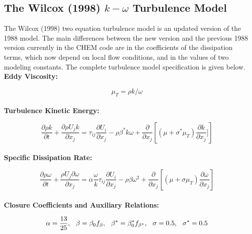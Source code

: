 \subsection{The Wilcox (1998) $k-\omega$ Turbulence Model}
\label{wilcox_kw}

The Wilcox (1998) two equation turbulence model\cite{WilcoxBook} is an
updated version of the 1988 model\cite{Wilcox.88}.  The main
differences between the new version and the previous 1988 version
currently in the CHEM code are in the coefficients of the dissipation
terms, which now depend on local flow conditions, and in the values of
two modeling constants.  The complete turbulence model specification
is given below.\\ 

\noindent
\textbf{Eddy Viscosity:}

\begin{equation}
\mu_T = \rho k/\omega
\label{eddy_viscosity}
\end{equation}\\

\noindent
\textbf{Turbulence Kinetic Energy:}

\begin{equation}
\frac{\partial{\rho k}} {\partial{t}} + \frac{\partial{\rho U_j k}}{\partial{x_j}} =
\tau_{ij} \frac{\partial{U_i}}{\partial{x_j}} - \rho \beta^* k \omega +
\frac{\partial}{\partial{x_j}} \left[ (\mu + \sigma^* \mu_T) \frac{\partial{k}}{\partial{x_j}}] \right]
\label{tke_equation}
\end{equation}\\

\noindent
\textbf{Specific Dissipation Rate:}

\begin{equation}
\frac{\partial{\rho \omega}} {\partial{t}} + \frac{\rho U_j \partial{\omega}}{\partial{x_j}} =
\alpha \frac{\omega}{k} \tau_{ij} \frac{\partial{U_i}}{\partial{x_j}} -
\rho \beta \omega^2 +
\frac{\partial}{\partial{x_j}} \left[ (\mu + \sigma \mu_T) \frac{\partial{\omega}}{\partial{x_j}} \right]
\label{omega_equation}
\end{equation}\\

\noindent
\textbf{Closure Coefficients and Auxiliary Relations:}

\begin{equation}
\alpha = \frac{13}{25}, \hspace{0.1in}
\beta = \beta_0 f_{\beta}, \hspace{0.1in}
\beta^* = \beta_{0}^* f_{\beta^*}, \hspace{0.1in}
\sigma = 0.5, \hspace{0.1in}
\sigma^* = 0.5
\label{coefficients_1}
\end{equation}\\

